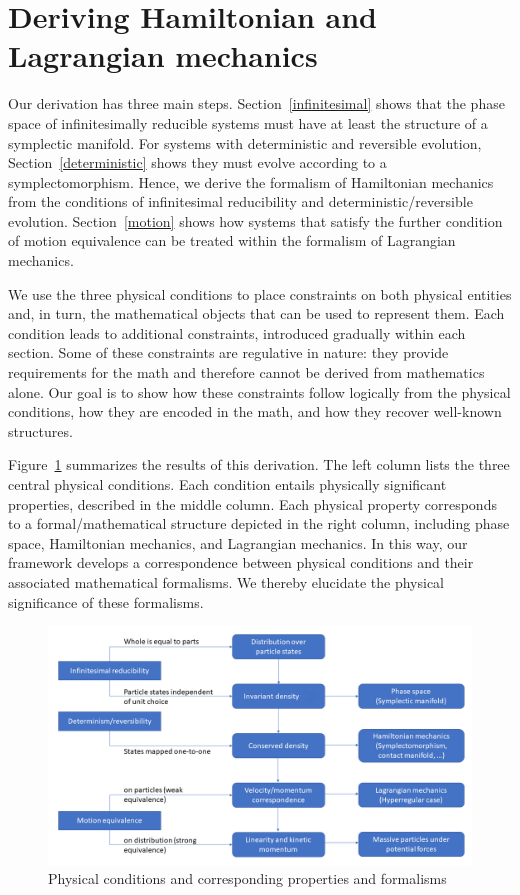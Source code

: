 \documentclass[12pt, english, twoside]{article} %
\begin{document}
\section{Deriving Hamiltonian and Lagrangian mechanics}
\label{derivation}

Our derivation has three main steps. Section~\ref{infinitesimal} shows that the phase space of infinitesimally reducible systems must have at least the structure of a symplectic manifold. For systems with deterministic and reversible evolution, Section~\ref{deterministic} shows they must evolve according to a symplectomorphism. Hence, we derive the formalism of Hamiltonian mechanics from the conditions of infinitesimal reducibility and deterministic/reversible evolution. Section~\ref{motion} shows how systems that satisfy the further condition of motion equivalence can be treated within the formalism of Lagrangian mechanics. 

We use the three physical conditions to place constraints on both physical entities and, in turn, the mathematical objects that can be used to represent them. Each condition leads to additional constraints, introduced gradually within each section.  Some of these constraints are regulative in nature: they provide requirements for the math and therefore cannot be derived from mathematics alone. Our goal is to show how these constraints follow logically from the physical conditions, how they are encoded in the math, and how they recover well-known structures.

Figure~\ref{diagram} summarizes the results of this derivation. The left column lists the three central physical conditions. Each condition entails physically significant properties, described in the middle column. Each physical property corresponds to a formal/mathematical structure depicted in the right column, including phase space, Hamiltonian mechanics, and Lagrangian mechanics. In this way, our framework develops a correspondence between physical conditions and their associated mathematical formalisms. We thereby elucidate the physical significance of these formalisms.

\begin{figure}[h]
	\centering
	\includegraphics[width=\textwidth]{Diagram.png}
\caption{Physical conditions and corresponding properties and formalisms}
\label{diagram}
\end{figure}
\end{document}

